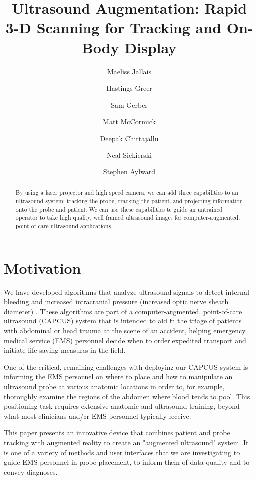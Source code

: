\documentclass{llncs}
\begin{document}
%
\frontmatter
%
\pagestyle{headings}
\title{Ultrasound Augmentation: Rapid 3-D Scanning for Tracking and On-Body Display}
\author{Maeliss Jallais \and Hastings Greer \and Sam Gerber \and Matt McCormick \and Deepak Chittajallu \and Neal Siekierski \and Stephen Aylward}
%
\mainmatter
\maketitle

\begin{abstract}
By using a laser projector and high speed camera, we can add three capabilities to an ultrasound system: tracking the probe, tracking the patient, and projecting information onto the probe and patient. We can use these capabilities to guide an untrained operator to take high quality, well framed ultrasound images for computer-augmented, point-of-care ultrasound applications.
\end{abstract}


\section{Motivation}
We have developed algorithms that analyze ultrasound signals to detect internal bleeding \cite{aylward2016ultrasound} and increased intracranial pressure (increased optic nerve sheath diameter) \cite{gerber2017automatic}. These algorithms are part of a computer-augmented, point-of-care ultrasound (CAPCUS) system that is intended to aid in the triage of patients with abdominal or head trauma at the scene of an accident, helping emergency medical service (EMS) personnel decide when to order expedited transport and initiate life-saving measures in the field.

One of the critical, remaining challenges with deploying our CAPCUS system is informing the EMS personnel on where to place and how to manipulate an ultrasound probe at various anatomic locations in order to, for example, thoroughly examine the regions of the abdomen where blood tends to pool. This positioning task requires extensive anatomic and ultrasound training, beyond what most clinicians and/or EMS personnel typically receive.

This paper presents an innovative device that combines patient and probe tracking with augmented reality to create an "augmented ultrasound" system.  It is one of a variety of methods and user interfaces that we are investigating to guide EMS personnel in probe placement, to inform them of data quality and to convey diagnoses.
\end{document}

